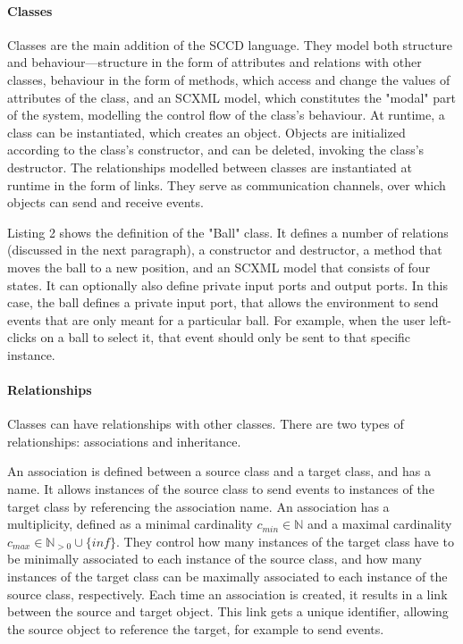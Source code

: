 \paragraph{Classes}
Classes are the main addition of the SCCD language. They model both structure and behaviour—structure in the form of 
attributes and relations with other classes, behaviour in the form of methods, which access and change the values of 
attributes of the class, and an SCXML model, which constitutes the "modal" part of the system, modelling the control flow 
of the class's behaviour. At runtime, a class can be instantiated, which creates an object. Objects are initialized according 
to the class's constructor, and can be deleted, invoking the class's destructor. The relationships modelled between classes 
are instantiated at runtime in the form of links. They serve as communication channels, over which objects can send and receive 
events.


Listing 2 shows the definition of the "Ball" class. It defines a number of relations (discussed in the next paragraph), a 
constructor and destructor, a method that moves the ball to a new position, and an SCXML model that consists of four states. 
It can optionally also define private input ports and output ports. In this case, the ball defines a private input port, that 
allows the environment to send events that are only meant for a particular ball. For example, when the user left-clicks on a 
ball to select it, that event should only be sent to that specific instance.

\paragraph{Relationships}
Classes can have relationships with other classes. There are two types of relationships: associations and inheritance.

An association is defined between a source class and a target class, and has a name. It allows instances of the source class 
to send events to instances of the target class by referencing the association name. An association has a multiplicity, 
defined as a minimal cardinality $c_{min} \in \mathbb{N}$ and a maximal cardinality $c_{max} \in \mathbb{N}_{>0} \cup \{inf\}$. 
They control how many instances of the target class have to be minimally associated to each instance of the source class, and 
how many instances of the target class can be maximally associated to each instance of the source class, respectively. Each 
time an association is created, it results in a link between the source and target object. This link gets a unique identifier, 
allowing the source object to reference the target, for example to send events.

